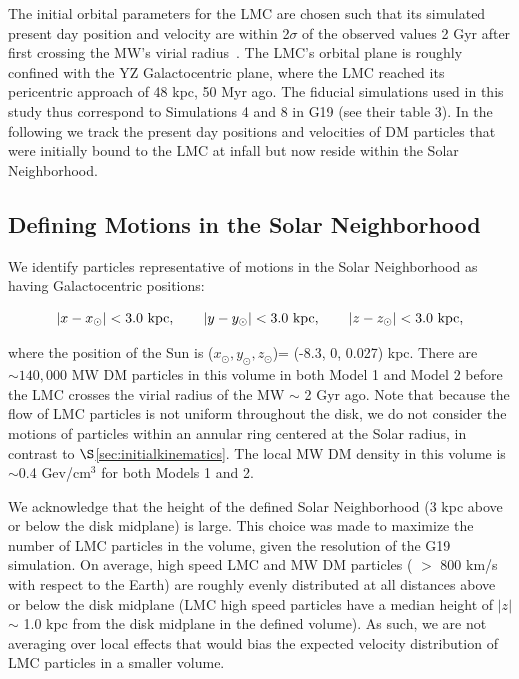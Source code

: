 \documentclass[letterpaper,11pt]{article}
\begin{document}
 The initial orbital parameters for the LMC are chosen such that its simulated present day 
 position and velocity are within 2$\sigma$ of the observed values 
 2 Gyr after first crossing the MW's virial radius~\citep{Kallivayalil:2013}.
 The LMC's orbital plane is roughly confined with the YZ Galactocentric plane, where the 
 LMC reached its pericentric approach of 48 kpc, 50 Myr ago.
 The fiducial simulations used in this study thus correspond 
 to Simulations 4 and 8 in G19 (see their table 3). 
 In the following we track 
 the present day positions and velocities of DM particles
 that were initially bound to the 
 LMC at infall but now reside within the Solar Neighborhood. 


\subsection{Defining Motions in the Solar Neighborhood}
\label{sec:motions}

We identify particles representative of motions in the Solar Neighborhood 
as having Galactocentric positions: 

\begin{equation}
    |x- x_\odot |  < 3.0 \,\, {\rm kpc},
    \qquad
    |y- y_\odot |  < 3.0 \,\, {\rm kpc},
    \qquad
    | z- z_\odot |   < 3.0 \,\, {\rm kpc},
\end{equation}

\noindent where the position of the Sun is
($x_\odot, y_\odot, z_\odot$)=  (-8.3, 0, 0.027) kpc. 
There are $\sim 140,000$ MW DM particles in this volume in both Model 1 and Model 2
before the LMC crosses
the virial radius of the MW $\sim$ 2 Gyr ago. 
Note that because the flow of LMC particles is not uniform
throughout the disk, 
we do not consider the motions of particles within an annular ring centered 
at the Solar radius, in contrast to $\S$\ref{sec:initialkinematics}. %
The local MW DM density in this volume is $\sim$0.4 Gev/cm$^3$ for both Models 1 and 2.

We acknowledge that the
height of the defined Solar Neighborhood (3 kpc above or below the disk midplane) is large. This choice was
made to 
maximize the number of LMC particles in the volume, given the resolution of the G19 simulation.
On average, high speed LMC and MW DM
particles ( $>$ 800 km/s with 
respect to the Earth) are 
roughly evenly distributed at all distances above or below the disk midplane
(LMC high speed particles have a median height of $|z|$ $\sim$ 1.0 kpc from the disk midplane in the defined volume). 
As such, we are not averaging over local effects 
that would bias the expected velocity distribution of LMC particles in a smaller volume.
\end{document}
